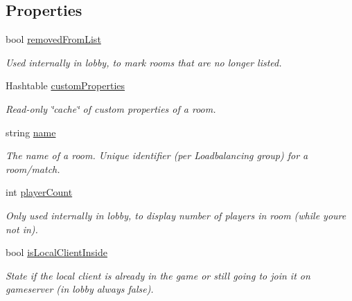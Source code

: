 \subsection*{Properties}
\begin{DoxyCompactItemize}
\item 
bool \hyperlink{class_room_info_af0811895b3b40f2b64d243d5fd8fd362}{removed\+From\+List}
\begin{DoxyCompactList}\small\item\em Used internally in lobby, to mark rooms that are no longer listed.\end{DoxyCompactList}\item 
Hashtable \hyperlink{class_room_info_a928b103a3e88d2c090152440aa6fa874}{custom\+Properties}
\begin{DoxyCompactList}\small\item\em Read-\/only \char`\"{}cache\char`\"{} of custom properties of a room. \end{DoxyCompactList}\item 
string \hyperlink{class_room_info_a77189ececa62ba47ff70359fd2db9af5}{name}
\begin{DoxyCompactList}\small\item\em The name of a room. Unique identifier (per Loadbalancing group) for a room/match.\end{DoxyCompactList}\item 
int \hyperlink{class_room_info_a211655578d31b9fed0817cad42e8f0b5}{player\+Count}
\begin{DoxyCompactList}\small\item\em Only used internally in lobby, to display number of players in room (while you\textquotesingle{}re not in). \end{DoxyCompactList}\item 
bool \hyperlink{class_room_info_a1e862ae572d36aba8d35f57241450082}{is\+Local\+Client\+Inside}
\begin{DoxyCompactList}\small\item\em State if the local client is already in the game or still going to join it on gameserver (in lobby always false). \end{DoxyCompactList}\item 

\end{DoxyCompactItemize}
